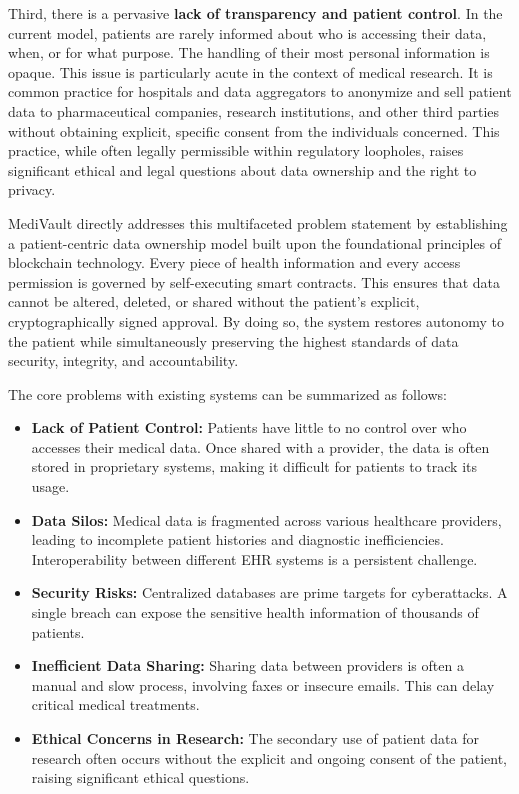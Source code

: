 Third, there is a pervasive \textbf{lack of transparency and patient control}. In the current model, patients are rarely informed about who is accessing their data, when, or for what purpose. The handling of their most personal information is opaque. This issue is particularly acute in the context of medical research. It is common practice for hospitals and data aggregators to anonymize and sell patient data to pharmaceutical companies, research institutions, and other third parties without obtaining explicit, specific consent from the individuals concerned. This practice, while often legally permissible within regulatory loopholes, raises significant ethical and legal questions about data ownership and the right to privacy.

MediVault directly addresses this multifaceted problem statement by establishing a patient-centric data ownership model built upon the foundational principles of blockchain technology. Every piece of health information and every access permission is governed by self-executing smart contracts. This ensures that data cannot be altered, deleted, or shared without the patient's explicit, cryptographically signed approval. By doing so, the system restores autonomy to the patient while simultaneously preserving the highest standards of data security, integrity, and accountability.

The core problems with existing systems can be summarized as follows:
\begin{itemize}
    \item \textbf{Lack of Patient Control:} Patients have little to no control over who accesses their medical data. Once shared with a provider, the data is often stored in proprietary systems, making it difficult for patients to track its usage.
    \item \textbf{Data Silos:} Medical data is fragmented across various healthcare providers, leading to incomplete patient histories and diagnostic inefficiencies. Interoperability between different EHR systems is a persistent challenge.
    \item \textbf{Security Risks:} Centralized databases are prime targets for cyberattacks. A single breach can expose the sensitive health information of thousands of patients.
    \item \textbf{Inefficient Data Sharing:} Sharing data between providers is often a manual and slow process, involving faxes or insecure emails. This can delay critical medical treatments.
    \item \textbf{Ethical Concerns in Research:} The secondary use of patient data for research often occurs without the explicit and ongoing consent of the patient, raising significant ethical questions.
\end{itemize}

